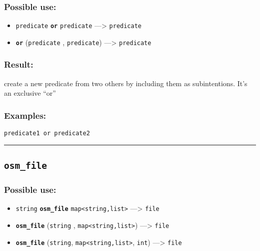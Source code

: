 \documentclass[]{book}
\providecommand{\tightlist}{%
  \setlength{\itemsep}{0pt}\setlength{\parskip}{0pt}}
\theoremstyle{definition}
\theoremstyle{definition}
\theoremstyle{definition}
\theoremstyle{remark}
\begin{document}
\subsubsection{Possible use:}\label{possible-use-386}

\begin{itemize}
\tightlist
\item
  \texttt{predicate} \textbf{\texttt{or}} \texttt{predicate}
  ---\textgreater{} \texttt{predicate}
\item
  \textbf{\texttt{or}} (\texttt{predicate} , \texttt{predicate})
  ---\textgreater{} \texttt{predicate}
\end{itemize}

\subsubsection{Result:}\label{result-372}

create a new predicate from two others by including them as
subintentions. It's an exclusive ``or''

\subsubsection{Examples:}\label{examples-264}

\begin{verbatim}
predicate1 or predicate2 
\end{verbatim}

\begin{center}\rule{0.5\linewidth}{\linethickness}\end{center}

\subsection{\texorpdfstring{\texttt{osm\_file}}{osm\_file}}\label{osm_file}

\subsubsection{Possible use:}\label{possible-use-387}

\begin{itemize}
\tightlist
\item
  \texttt{string} \textbf{\texttt{osm\_file}}
  \texttt{map\textless{}string,list\textgreater{}} ---\textgreater{}
  \texttt{file}
\item
  \textbf{\texttt{osm\_file}} (\texttt{string} ,
  \texttt{map\textless{}string,list\textgreater{}}) ---\textgreater{}
  \texttt{file}
\item
  \textbf{\texttt{osm\_file}} (\texttt{string},
  \texttt{map\textless{}string,list\textgreater{}}, \texttt{int})
  ---\textgreater{} \texttt{file}
\end{itemize}
\end{document}
